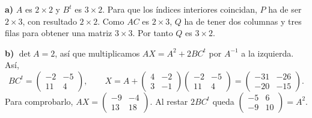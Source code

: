 \textbf{a)} $A$ es $2\times2$ y $B^t$ es $3\times2$.
Para que los índices interiores coincidan, $P$ ha de ser
$\boxed{2\times3}$, con resultado $2\times2$.
Como $AC$ es $2\times3$, $Q$ ha de tener dos columnas y tres filas
para obtener una matriz $3\times3$. Por tanto $Q$ es $\boxed{3\times2}$.

\textbf{b)} $\det A=2$, así que multiplicamos $AX=A^2+2BC^t$
por $A^{-1}$ a la izquierda. Así,
\[
BC^t=\begin{pmatrix}-2&-5\\11&4\end{pmatrix},\qquad
X=A+\begin{pmatrix}4&-2\\3&-1\end{pmatrix}
\begin{pmatrix}-2&-5\\11&4\end{pmatrix}
=\boxed{\begin{pmatrix}-31&-26\\-20&-15\end{pmatrix}}.
\]
Para comprobarlo, $AX=\begin{pmatrix}-9&-4\\13&18\end{pmatrix}$.
Al restar $2BC^t$ queda $\begin{pmatrix}-5&6\\-9&10\end{pmatrix}=A^2$.
